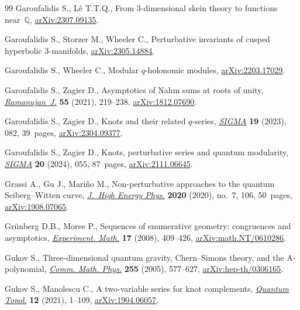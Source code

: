 \documentclass[pdftex]{sigma}
\numberwithin{equation}{section}
\begin{document}
\begin{thebibliography}{99}
Garoufalidis S., L\^e T.T.Q., From 3-dimensional skein theory to functions
  near~{$\mathbb{Q}$}, \href{https://arxiv.org/abs/2307.09135}{arXiv:2307.09135}.

Garoufalidis S., Storzer M., Wheeler C., Perturbative invariants of cusped
  hyperbolic 3-manifolds, \href{https://arxiv.org/abs/2305.14884}{arXiv:2305.14884}.

Garoufalidis S., Wheeler C., Modular $q$-holonomic modules,
  \href{https://arxiv.org/abs/2203.17029}{arXiv:2203.17029}.

Garoufalidis S., Zagier D., Asymptotics of {N}ahm sums at roots of unity,
  \href{https://doi.org/10.1007/s11139-020-00266-x}{\textit{Ramanujan~J.}} \textbf{55} (2021), 219--238, \href{https://arxiv.org/abs/1812.07690}{arXiv:1812.07690}.

Garoufalidis S., Zagier D., Knots and their related {$q$}-series,
  \href{https://doi.org/10.3842/SIGMA.2023.082}{\textit{SIGMA}} \textbf{19} (2023), 082, 39~pages, \href{https://arxiv.org/abs/2304.09377}{arXiv:2304.09377}.

Garoufalidis S., Zagier D., Knots, perturbative series and quantum modularity,
  \href{https://doi.org/10.3842/SIGMA.2024.055}{\textit{SIGMA}} \textbf{20} (2024), 055, 87~pages, \href{https://arxiv.org/abs/2111.06645}{arXiv:2111.06645}.

Grassi A., Gu J., Mari\~no M., Non-perturbative approaches to the quantum
  {S}eiberg--{W}itten curve, \href{https://doi.org/10.1007/jhep07(2020)106}{\textit{J.~High Energy Phys.}} \textbf{2020}
  (2020), no.~7, 106, 50~pages, \href{https://arxiv.org/abs/1908.07065}{arXiv:1908.07065}.

Gr\"unberg D.B., Moree P., Sequences of enumerative geometry: congruences and
  asymptotics, \href{https://doi.org/10.1080/10586458.2008.10128870}{\textit{Experiment. Math.}} \textbf{17} (2008), 409--426,
  \href{https://arxiv.org/abs/math.NT/0610286}{arXiv:math.NT/0610286}.

Gukov S., Three-dimensional quantum gravity, {C}hern--{S}imons theory, and the
  {A}-polynomial, \href{https://doi.org/10.1007/s00220-005-1312-y}{\textit{Comm. Math. Phys.}} \textbf{255} (2005), 577--627,
  \href{https://arxiv.org/abs/hep-th/0306165}{arXiv:hep-th/0306165}.

Gukov S., Manolescu C., A two-variable series for knot complements,
  \href{https://doi.org/10.4171/qt/145}{\textit{Quantum Topol.}} \textbf{12} (2021), 1--109, \href{https://arxiv.org/abs/1904.06057}{arXiv:1904.06057}.


\end{thebibliography}
\end{document}
